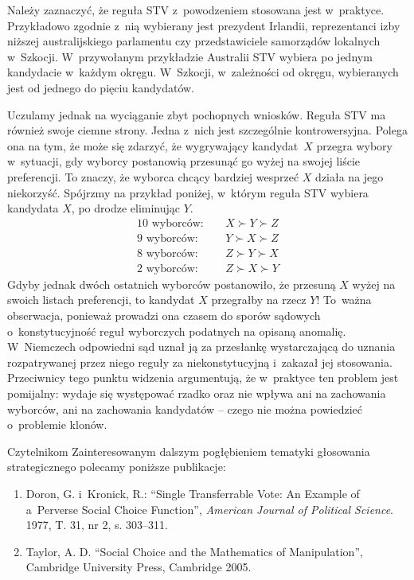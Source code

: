 Należy zaznaczyć, że reguła STV z~powodzeniem stosowana jest w~praktyce. Przykładowo zgodnie z~nią wybierany jest prezydent Irlandii,
reprezentanci izby niższej australijskiego parlamentu czy przedstawiciele samorządów lokalnych w~Szkocji. W~przywołanym przykładzie Australii STV wybiera po jednym kandydacie w~każdym okręgu. W~Szkocji, w~zależności od okręgu, wybieranych jest od jednego do pięciu kandydatów.

Uczulamy jednak na wyciąganie zbyt pochopnych wniosków.
Reguła STV  ma również swoje ciemne strony.
Jedna z~nich jest szczególnie kontrowersyjna.
Polega ona na tym, że może się zdarzyć, że wygrywający kandydat~$X$ przegra wybory w~sytuacji, gdy wyborcy postanowią przesunąć go wyżej na swojej liście preferencji.
To znaczy, że wyborca chcący bardziej wesprzeć $X$ działa na jego niekorzyść. Spójrzmy na przykład poniżej, w~którym reguła STV wybiera kandydata $X$, po drodze eliminując $Y$.
\begin{align*}
10\text{ wyborców}:& \quad X \succ Y \succ Z\\
9\text{ wyborców}:& \quad Y \succ X \succ Z\\
8\text{ wyborców}:& \quad Z \succ Y \succ X\\
2\text{ wyborców}:& \quad Z \succ X \succ Y
\end{align*}
Gdyby jednak dwóch ostatnich wyborców postanowiło, że
przesuną $X$ wyżej na swoich listach preferencji,
to kandydat $X$ przegrałby na rzecz $Y$!
To~ważna obserwacja, ponieważ prowadzi ona czasem
do sporów sądowych o~konstytucyjność reguł wyborczych
podatnych na opisaną anomalię. W~Niemczech odpowiedni
sąd uznał ją za przesłankę wystarczającą 
do uznania rozpatrywanej przez niego reguły za niekonstytucyjną
i~zakazał jej stosowania.
Przeciwnicy tego punktu widzenia argumentują, że w~praktyce ten problem jest pomijalny: wydaje się występować rzadko oraz nie wpływa ani na zachowania wyborców, ani na zachowania kandydatów -- czego nie można powiedzieć o~problemie klonów. 

Czytelnikom Zainteresowanym dalszym pogłębieniem tematyki głosowania 
strategicznego polecamy poniższe publikacje:
\begin{enumerate}
    \item Doron, G. i~Kronick, R.: ``Single Transferrable Vote: An Example of a~Perverse Social Choice Function'', \emph{American Journal of Political Science}. 1977, T. 31, nr 2, s. 303--311.
    \item Taylor, A. D. ``{Social Choice and the Mathematics of Manipulation}'',  Cambridge University Press, Cambridge 2005.
\end{enumerate}

\vfill


\eject
